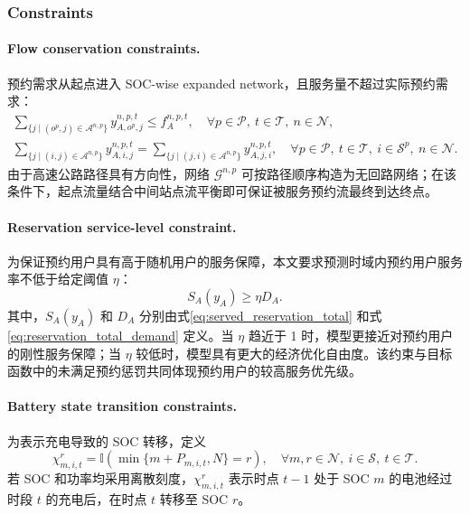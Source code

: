 \documentclass[12pt,hyperref,a4paper,UTF8]{ctexart}
\begin{document}
\subsubsection{Constraints}

\paragraph{Flow conservation constraints.}
预约需求从起点进入 SOC-wise expanded network，且服务量不超过实际预约需求：
\begin{subequations}
\label{eq:flow}
\begin{gather}
\sum_{\{j\mid (o^p,j)\in \mathcal{A}^{n,p}\}}{y_{A,o^p,j}^{n,p,t}} \leq f_A^{n,p,t},
\quad \forall p\in \mathcal{P},\ t\in \mathcal{T},\ n \in \mathcal{N},\label{eq:flow1}\\
\sum_{\{j\mid (i,j)\in \mathcal{A}^{n,p}\}}{y_{A,i,j}^{n,p,t}} =
\sum_{\{j\mid (j,i)\in \mathcal{A}^{n,p}\}}{y_{A,j,i}^{n,p,t}},
\quad \forall p\in \mathcal{P},\ t\in \mathcal{T},\ i\in \mathcal{S}^p,
\ n\in\mathcal{N}.
\label{eq:flow2}
\end{gather}
\end{subequations}
由于高速公路路径具有方向性，网络 $\mathcal{G}^{n,p}$ 可按路径顺序构造为无回路网络；在该条件下，起点流量结合中间站点流平衡即可保证被服务预约流最终到达终点。

\paragraph{Reservation service-level constraint.}
为保证预约用户具有高于随机用户的服务保障，本文要求预测时域内预约用户服务率不低于给定阈值 $\eta$：
\begin{equation}
S_A(y_A)\ge \eta D_A.
\label{eq:reservation_service_rate}
\end{equation}
其中，$S_A(y_A)$ 和 $D_A$ 分别由式\eqref{eq:served_reservation_total} 和式\eqref{eq:reservation_total_demand} 定义。当 $\eta$ 趋近于 1 时，模型更接近对预约用户的刚性服务保障；当 $\eta$ 较低时，模型具有更大的经济优化自由度。该约束与目标函数中的未满足预约惩罚共同体现预约用户的较高服务优先级。

\paragraph{Battery state transition constraints.}
为表示充电导致的 SOC 转移，定义
\begin{equation}
\chi_{m,i,t}^{r}=\mathbb{I}\!\left(\min\{m+P_{m,i,t},N\}=r\right),
\quad \forall m,r\in\mathcal{N},\ i\in\mathcal{S},\ t\in\mathcal{T}.
\label{eq:charging_indicator}
\end{equation}
若 SOC 和功率均采用离散刻度，$\chi_{m,i,t}^{r}$ 表示时点 $t-1$ 处于 SOC $m$ 的电池经过时段 $t$ 的充电后，在时点 $t$ 转移至 SOC $r$。
\end{document}
